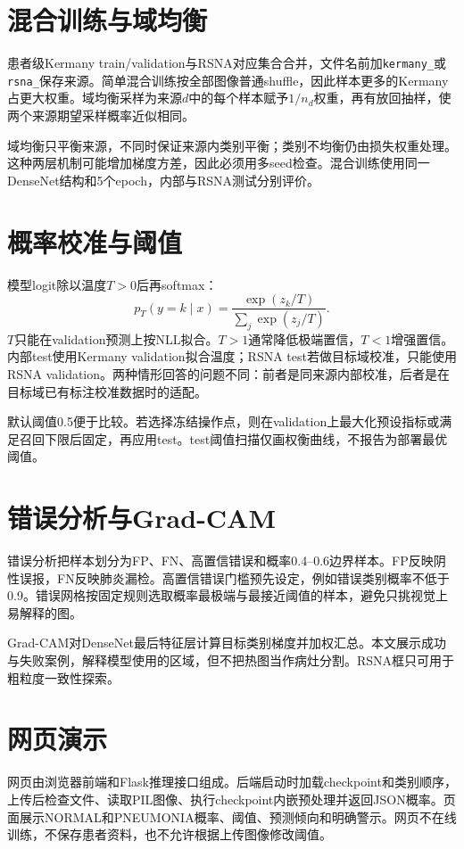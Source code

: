 \section{混合训练与域均衡}

患者级Kermany train/validation与RSNA对应集合合并，文件名前加\texttt{kermany\_}或\texttt{rsna\_}保存来源。简单混合训练按全部图像普通shuffle，因此样本更多的Kermany占更大权重。域均衡采样为来源$d$中的每个样本赋予$1/n_d$权重，再有放回抽样，使两个来源期望采样概率近似相同。

域均衡只平衡来源，不同时保证来源内类别平衡；类别不均衡仍由损失权重处理。这种两层机制可能增加梯度方差，因此必须用多seed检查。混合训练使用同一DenseNet结构和5个epoch，内部与RSNA测试分别评价。

\section{概率校准与阈值}

模型logit除以温度$T>0$后再softmax：
\begin{equation}
p_T(y=k\mid x)=\frac{\exp(z_k/T)}{\sum_j\exp(z_j/T)}.
\end{equation}
$T$只能在validation预测上按NLL拟合。$T>1$通常降低极端置信，$T<1$增强置信。内部test使用Kermany validation拟合温度；RSNA test若做目标域校准，只能使用RSNA validation。两种情形回答的问题不同：前者是同来源内部校准，后者是在目标域已有标注校准数据时的适配。

默认阈值0.5便于比较。若选择冻结操作点，则在validation上最大化预设指标或满足召回下限后固定，再应用test。test阈值扫描仅画权衡曲线，不报告为部署最优阈值。

\section{错误分析与Grad-CAM}

错误分析把样本划分为FP、FN、高置信错误和概率0.4--0.6边界样本。FP反映阴性误报，FN反映肺炎漏检。高置信错误门槛预先设定，例如错误类别概率不低于0.9。错误网格按固定规则选取概率最极端与最接近阈值的样本，避免只挑视觉上易解释的图。

Grad-CAM对DenseNet最后特征层计算目标类别梯度并加权汇总。本文展示成功与失败案例，解释模型使用的区域，但不把热图当作病灶分割。RSNA框只可用于粗粒度一致性探索。

\section{网页演示}

网页由浏览器前端和Flask推理接口组成。后端启动时加载checkpoint和类别顺序，上传后检查文件、读取PIL图像、执行checkpoint内嵌预处理并返回JSON概率。页面展示NORMAL和PNEUMONIA概率、阈值、预测倾向和明确警示。网页不在线训练，不保存患者资料，也不允许根据上传图像修改阈值。

